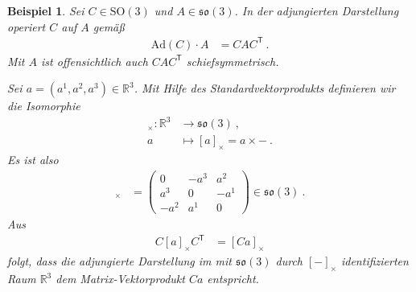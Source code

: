 \documentclass[10pt,a4paper]{article}
\theoremstyle{mytheorem}
\theoremstyle{mydefinition}
\newtheorem{example}[theorem]{Beispiel}
\newcommand{\trans}{^\mathsf{T}}
\newcommand{\Ad}{\mathrm{Ad}}
\newcommand{\SO}{\mathrm{SO}}
\newcommand{\fso}{\mathfrak{so}}
\begin{document}
\begin{example}
\label{ex:Ad}
Sei $C\in\SO(3)$ und $A\in\fso(3)$.
In der adjungierten Darstellung operiert $C$ auf $A$ gemäß
\begin{align*}
	\Ad(C)\cdot A &= CAC\trans
	\ .
\end{align*}
Mit $A$ ist offensichtlich auch $CAC\trans$ schiefsymmetrisch.

Sei $a=(a^1, a^2, a^3)\in\mathbb{R}^3$.
Mit Hilfe des Standardvektorprodukts definieren wir die Isomorphie
\begin{align*}
	[-]_\times: 
	\mathbb{R}^3&\rightarrow\fso(3)
	\ ,\nonumber\\
	a &\mapsto [a]_\times = a\times-
	\ .
\end{align*}
Es ist also
\begin{align*}
	[a]_\times
	&=
	\begin{pmatrix}
		0    & -a^3 &  a^2 \\
		 a^3 &    0 & -a^1 \\
		-a^2 &  a^1 &    0
	\end{pmatrix}
	\in\fso(3)
	\ .
\end{align*}
Aus 
\begin{align*}
	C[a]_\times C\trans &= [Ca]_\times
\end{align*}
folgt, dass die adjungierte Darstellung im mit $\fso(3)$ durch $[-]_\times$ identifizierten Raum $\mathbb{R}^3$ dem Matrix-Vektorprodukt $Ca$ entspricht.
\end{example}
\end{document}
